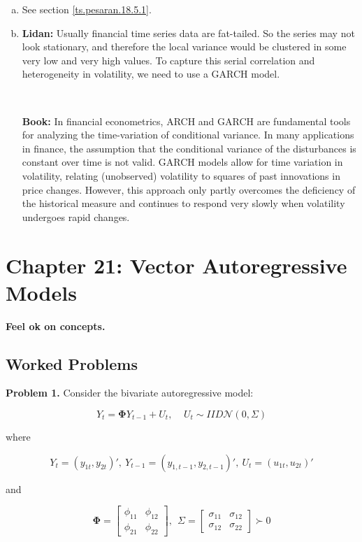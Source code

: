 \begin{enumerate}[(a)]
\item See section \ref{ts.pesaran.18.5.1}.

\item \textbf{Lidan:} Usually financial time series data are fat-tailed. So the series may not look stationary, and therefore the local variance would be clustered in some very low and very high values. To capture this serial correlation and heterogeneity in volatility, we need to use a GARCH model.

\

\textbf{Book:} In financial econometrics, ARCH and GARCH are fundamental tools for analyzing the time-variation of conditional variance. In many applications in finance, the assumption that the conditional variance of the disturbances is constant over time is not valid. GARCH models allow for time variation in volatility, relating (unobserved) volatility to squares of past innovations in price changes. However, this approach only partly overcomes the deficiency of the historical measure and continues to respond very slowly when volatility undergoes rapid changes.

\end{enumerate}

%
%
%
%
%
%

\section{Chapter 21: Vector Autoregressive Models}

\textbf{Feel ok on concepts.}

\subsection{Worked Problems} \label{ts.ch21.worked.problems}

\textbf{Problem 1.} Consider the bivariate autoregressive model:

\begin{equation}\label{ts.hw6.2.3}
Y_t = \boldsymbol{\Phi}Y_{t-1} + U_t, \ \ \ \ \ U_t \sim IID \mathcal{N}(0, \Sigma)
\end{equation}

where

\[
Y_t = (y_{1t}, y_{2t})', \ Y_{t-1} = (y_{1, t-1}, y_{2, t-1})', \ U_t = (u_{1t}, u_{2t})'
\]

and

\[
\boldsymbol{\Phi} = \begin{bmatrix}\phi_{11} & \phi_{12} \\ \phi_{21} & \phi_{22} \end{bmatrix}, \ \ \Sigma = \begin{bmatrix} \sigma_{11} & \sigma_{12} \\ \sigma_{12} & \sigma_{22} \end{bmatrix} \succ 0
\]


